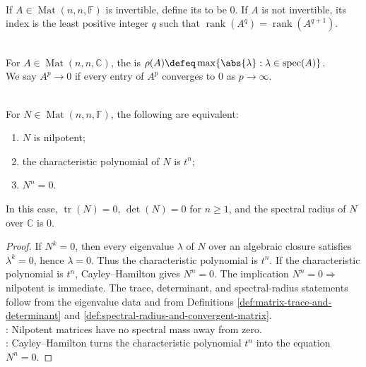 \begin{definition} \label{def:matrix-index} \\
If $A\in\operatorname{Mat}(n,n,\mathbb{F})$ is invertible, define its  to be $0$. If $A$ is not invertible, its index is the least positive integer $q$ such that $\operatorname{rank}(A^q)=\operatorname{rank}(A^{q+1})$.
\end{definition}

\begin{definition} \label{def:spectral-radius-and-convergent-matrix} \\
For $A\in\operatorname{Mat}(n,n,\mathbb{C})$, the  is $\rho(A)\defeq\max\{\abs{\lambda}:\lambda\in\operatorname{spec}(A)\}$.\\
We say $A^p\to0$ if every entry of $A^p$ converges to $0$ as $p\to\infty$.
\end{definition}

\begin{proposition} \label{prop:nilpotent-matrix-basic-invariants} \\
For $N\in\operatorname{Mat}(n,n,\mathbb{F})$, the following are equivalent:
\begin{enumerate}[label=(\roman*)]
\setlength{\itemsep}{0pt}
\item $N$ is nilpotent;
\item the characteristic polynomial of $N$ is $t^n$;
\item $N^n=0$.
\end{enumerate}
In this case, $\operatorname{tr}(N)=0$, $\det(N)=0$ for $n\geq1$, and the spectral radius of $N$ over $\mathbb{C}$ is $0$.
\begin{proof}
If $N^k=0$, then every eigenvalue $\lambda$ of $N$ over an algebraic closure satisfies $\lambda^k=0$, hence $\lambda=0$. Thus the characteristic polynomial is $t^n$. If the characteristic polynomial is $t^n$, Cayley--Hamilton gives $N^n=0$. The implication $N^n=0\Rightarrow$ nilpotent is immediate. The trace, determinant, and spectral-radius statements follow from the eigenvalue data and from Definitions \ref{def:matrix-trace-and-determinant} and \ref{def:spectral-radius-and-convergent-matrix}.\\
: Nilpotent matrices have no spectral mass away from zero.\\
: Cayley--Hamilton turns the characteristic polynomial $t^n$ into the equation $N^n=0$.
\end{proof}
\end{proposition}

